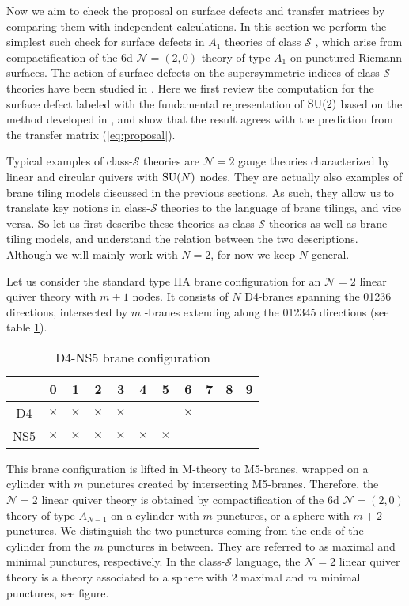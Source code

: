 Now we aim to check the proposal on surface defects and transfer matrices
by comparing them with independent calculations. In this section we
perform the simplest such check for surface defects in $A_{1}$ theories
of class $\mathcal{S}$ \cite{Gaiotto:2009we,Gaiotto:2009hg}, which arise from compactification
of the 6d $\mathcal{N}=\left(2,0\right)$ theory of type $A_{1}$
on punctured Riemann surfaces. The action of surface defects on the
supersymmetric indices of class-$\mathcal{S}$ theories have been
studied in \cite{Gaiotto:2012xa, Gadde:2013dda, Alday:2013kda,Bullimore:2014nla}. Here we first review the computation for the surface
defect labeled with the fundamental representation of $\mathrm{SU}(2)$ based
on the method developed in \cite{Gaiotto:2012xa}, and show that the result agrees
with the prediction from the transfer matrix (\ref{eq:proposal}).

Typical examples of class-$\mathcal{S}$ theories are $\mathcal{N}=2$
gauge theories characterized by linear and circular quivers with $\mathrm{SU}(N)$
nodes. They are actually also examples of brane tiling models discussed
in the previous sections. As such, they allow us to translate key
notions in class-$\mathcal{S}$ theories to the language of brane
tilings, and vice versa. So let us first describe these theories as
class-$\mathcal{S}$ theories as well as brane tiling models, and
understand the relation between the two descriptions. Although we
will mainly work with $N=2$, for now we keep $N$ general.

Let us consider the standard type IIA brane configuration for an $\mathcal{N}=2$
linear quiver theory with $m+1$ nodes. It consists of $N$ D4-branes
spanning the 01236 directions, intersected by $m$ -branes extending
along the 012345 directions (see table \ref{tab:D4NS5}).
\begin{table}
\caption{D4-NS5 brane configuration}
\label{tab:D4NS5}
\vspace{0.2cm}
  \centering
    \begin{tabular}{|c|c|c|c|c|c|c|c|c|c|c|}
\hline
  & 0 & 1 & 2 & 3 & 4 & 5 & 6 & 7 & 8 & 9\tabularnewline
\hline
D4       & $\times$ & $\times$ & $\times$ & $\times$ &    &    &    $\times$ & \phantom{X} & \phantom{X} &  \tabularnewline
\hline
NS5    & $\times$ & $\times$ & $\times$ & $\times$ & $\times$ & $\times$ &    &    &    &  \phantom{X}  \tabularnewline
\hline
    \end{tabular}
\end{table}
This brane configuration is lifted in M-theory to M5-branes, wrapped
on a cylinder with $m$ punctures created by intersecting M5-branes.
Therefore, the $\mathcal{N}=2$ linear quiver theory is obtained by
compactification of the 6d $\mathcal{N}=\left( 2,0 \right)$ theory
of type $A_{N-1}$ on a cylinder with $m$ punctures, or a sphere
with $m+2$ punctures. We distinguish the two punctures coming from
the ends of the cylinder from the $m$ punctures in between. They
are referred to as maximal and minimal punctures, respectively. In
the class-$\mathcal{S}$ language, the $\mathcal{N}=2$ linear quiver
theory is a theory associated to a sphere with $2$ maximal and $m$
minimal punctures, see figure.

